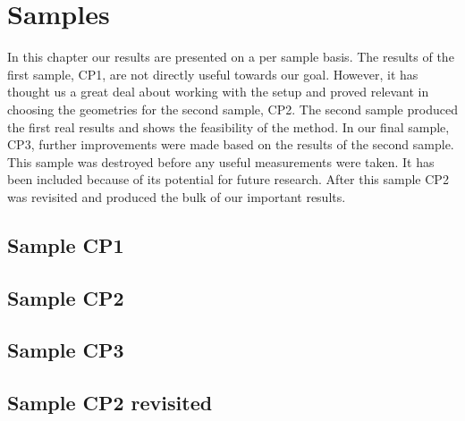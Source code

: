 \chapter{Samples}
In this chapter our results are presented on a per sample basis. The results of the first sample, CP1, are not directly useful towards our goal. However, it has thought us a great deal about working with the setup and proved relevant in choosing the geometries for the second sample, CP2. The second sample produced the first real results and shows the feasibility of the method. In our final sample, CP3, further improvements were made based on the results of the second sample. This sample was destroyed before any useful measurements were taken. It has been included because of its potential for future research. After this sample CP2 was revisited and produced the bulk of our important results.

\section{Sample CP1}


\newpage
\section{Sample CP2}


\newpage
\section{Sample CP3}


\newpage
\section{Sample CP2 revisited}
